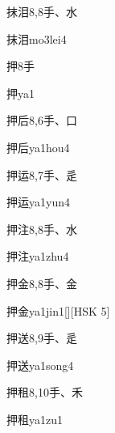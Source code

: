 \begin{entry}{抹泪}{8,8}{⼿、⽔}
  \begin{phonetics}{抹泪}{mo3lei4}
  \end{phonetics}
\end{entry}

\begin{entry}{押}{8}{⼿}
  \begin{phonetics}{押}{ya1}
  \end{phonetics}
\end{entry}

\begin{entry}{押后}{8,6}{⼿、⼝}
  \begin{phonetics}{押后}{ya1hou4}
  \end{phonetics}
\end{entry}

\begin{entry}{押运}{8,7}{⼿、⾡}
  \begin{phonetics}{押运}{ya1yun4}
  \end{phonetics}
\end{entry}

\begin{entry}{押注}{8,8}{⼿、⽔}
  \begin{phonetics}{押注}{ya1zhu4}
  \end{phonetics}
\end{entry}

\begin{entry}{押金}{8,8}{⼿、⾦}
  \begin{phonetics}{押金}{ya1jin1}[][HSK 5]
  \end{phonetics}
\end{entry}

\begin{entry}{押送}{8,9}{⼿、⾡}
  \begin{phonetics}{押送}{ya1song4}
  \end{phonetics}
\end{entry}

\begin{entry}{押租}{8,10}{⼿、⽲}
  \begin{phonetics}{押租}{ya1zu1}
  \end{phonetics}
\end{entry}


